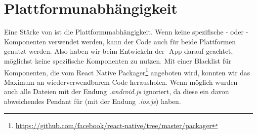 \section{Plattformunabhängigkeit}
Eine Stärke von  ist die Plattformunabhängigkeit. 
Wenn keine spezifische - oder -Komponenten verwendet werden, kann der Code auch für beide Plattformen genutzt werden.
Also haben wir beim Entwickeln der -App darauf geachtet, möglichst keine spezifische Komponenten zu nutzen. 
Mit einer Blacklist für Komponenten, die vom React Native Packager\footnote{\url{https://github.com/facebook/react-native/tree/master/packager}} angeboten wird, konnten wir das Maximum an wiederverwendbarem Code herausholen. 
Wenn möglich wurden auch alle Dateien mit der Endung \textit{.android.js} ignoriert, da diese ein davon abweichendes Pendant für  (mit der Endung \textit{.ios.js}) haben.
